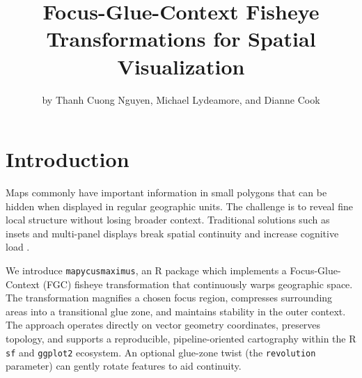 \title{Focus-Glue-Context Fisheye Transformations for Spatial Visualization}


\author{by Thanh Cuong Nguyen, Michael Lydeamore, and Dianne Cook}

\maketitle


\section{Introduction}\label{introduction}

Maps commonly have important information in small polygons that can be hidden when displayed in regular geographic units. The challenge is to reveal fine local structure without losing broader context. Traditional solutions such as insets and multi-panel displays break spatial continuity and increase cognitive load \citep{cockburn2008}.

We introduce \texttt{mapycusmaximus}, an R package which implements a Focus-Glue-Context (FGC) fisheye transformation that continuously warps geographic space. The transformation magnifies a chosen focus region, compresses surrounding areas into a transitional glue zone, and maintains stability in the outer context. The approach operates directly on vector geometry coordinates, preserves topology, and supports a reproducible, pipeline-oriented cartography within the R \texttt{sf} and \texttt{ggplot2} ecosystem. An optional glue-zone twist (the \texttt{revolution} parameter) can gently rotate features to aid continuity.

